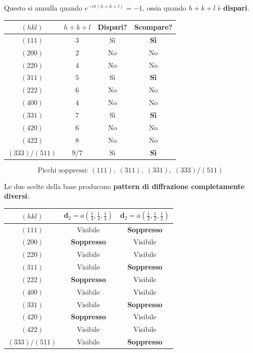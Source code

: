 Questo si annulla quando $e^{-i\pi(h+k+l)} = -1$, ossia quando $h + k + l$ è \textbf{dispari}.

\begin{table}[h!]
\centering
\begin{tabular}{|c|c|c|c|}
\hline
$(hkl)$ & $h+k+l$ & Dispari? & Scompare? \\ \hline
$(111)$ & $3$ & Sì & \textbf{Sì} \\
$(200)$ & $2$ & No & No \\
$(220)$ & $4$ & No & No \\
$(311)$ & $5$ & Sì & \textbf{Sì} \\
$(222)$ & $6$ & No & No \\
$(400)$ & $4$ & No & No \\
$(331)$ & $7$ & Sì & \textbf{Sì} \\
$(420)$ & $6$ & No & No \\
$(422)$ & $8$ & No & No \\
$(333)/(511)$ & $9/7$ & Sì & \textbf{Sì} \\ \hline
\end{tabular}
\end{table}

\begin{equation}
\boxed{\text{Picchi soppressi: } (111),\; (311),\; (331),\; (333)/(511)}
\end{equation}


Le due scelte della base producono \textbf{pattern di diffrazione completamente diversi}:

\begin{table}[h!]
\centering
\begin{tabular}{|c|c|c|}
\hline
$(hkl)$ & $\mathbf{d}_2 = a(\frac{1}{4},\frac{1}{4},\frac{1}{4})$ & $\mathbf{d}_2 = a(\frac{1}{2},\frac{1}{2},\frac{1}{2})$ \\ \hline
$(111)$ & Visibile & \textbf{Soppresso} \\
$(200)$ & \textbf{Soppresso} & Visibile \\
$(220)$ & Visibile & Visibile \\
$(311)$ & Visibile & \textbf{Soppresso} \\
$(222)$ & \textbf{Soppresso} & Visibile \\
$(400)$ & Visibile & Visibile \\
$(331)$ & Visibile & \textbf{Soppresso} \\
$(420)$ & \textbf{Soppresso} & Visibile \\
$(422)$ & Visibile & Visibile \\
$(333)/(511)$ & Visibile & \textbf{Soppresso} \\ \hline
\end{tabular}
\end{table}


